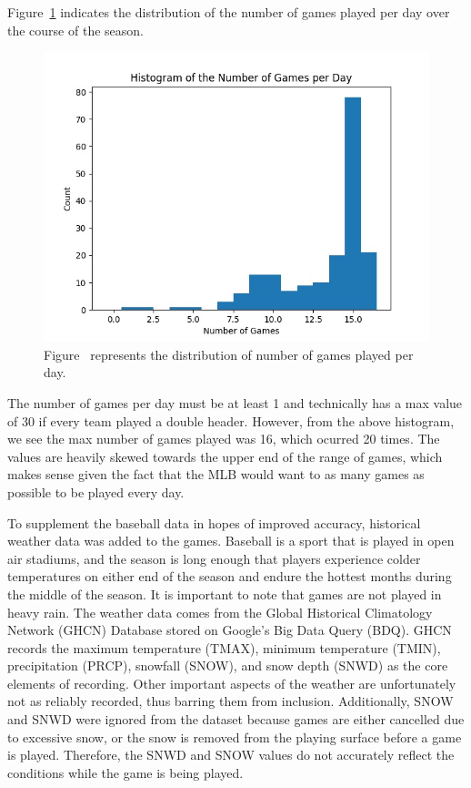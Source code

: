 \documentclass{article}
\begin{document}
Figure~\ref{Fig:GPD} indicates the distribution of the number of games played
per day over the course of the season.
\begin{figure}[ht]
    \centering
    \includegraphics[width=.8\textwidth]{num-games-hist.jpg}
    \caption{Figure~\label{Fig:GPD} represents the distribution of number of 
    games played per day.}
\end{figure}
The number of games per day must be at least 1 and
technically has a max value of 30 if every team played a double header.
However,
from the above histogram,
we see the max number of games played was 16,
which ocurred 20 times.
The values are heavily skewed towards the upper end of the range of games,
which makes sense given the fact that the MLB would want to as many games
as possible to be played every day.


To supplement the baseball data in hopes of improved accuracy,
historical weather data was added to the games.
Baseball is a sport that is played in open air stadiums,
and the season is long enough that players experience colder temperatures
on either end of the season and endure the hottest months during the middle of
the season.
It is important to note that games are not played in heavy rain.
The weather data comes from the Global Historical Climatology Network (GHCN) 
Database stored on Google's Big Data Query (BDQ).
GHCN records the maximum temperature (TMAX),
minimum temperature (TMIN),
precipitation (PRCP),
snowfall (SNOW),
and snow depth (SNWD) as the core elements of recording.
Other important aspects of the weather are unfortunately not as reliably
recorded,
thus barring them from inclusion.
Additionally,
SNOW and SNWD were ignored from the dataset because games are either cancelled
due to excessive snow,
or the snow is removed from the playing surface before a game is played.
Therefore,
the SNWD and SNOW values do not accurately reflect the conditions while the
game is being played. \par
\end{document}

